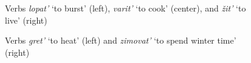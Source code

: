 \begin{figure}[H]\small
\hfill%
\hfill%
%
\caption{Verbs \textit{lopat'} `to burst' (left), \textit{varit'} `to cook' (center), and \textit{\v{z}it'} `to live' (right) \label{app:frame:lopat}}
\end{figure}

\begin{figure}[H]
\hfill%
%
\caption{Verbs \textit{gret'} `to heat' (left) and  \textit{zimovat'} `to spend winter time' (right) \label{app:live}}
\end{figure}


